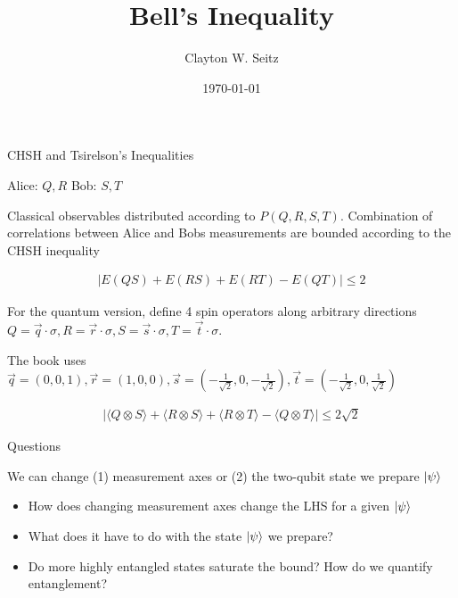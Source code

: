 \documentclass[aspectratio=1610]{beamer}					%
\title{Bell's Inequality}	%
\author{Clayton W. Seitz}								%
\date{\today}									%
\begin{document}
\begin{frame}
  \titlepage
\end{frame}

\begin{frame}{CHSH and Tsirelson's Inequalities}

\vspace{0.2in}

Alice: $Q,R$
Bob: $S, T$

\vspace{0.1in}
Classical observables distributed according to $P(Q,R,S,T)$. Combination of correlations between Alice and Bobs measurements are bounded according to the CHSH inequality

\begin{align*}
|E(QS) + E(RS) + E(RT) - E(QT)| \leq 2
\end{align*}

For the quantum version, define 4 spin operators along arbitrary directions $Q = \vec{q}\cdot\sigma, R = \vec{r}\cdot\sigma, S = \vec{s}\cdot\sigma, T = \vec{t}\cdot\sigma$.

The book uses $\vec{q} = (0,0,1), \vec{r} = (1,0,0), \vec{s} = (-\frac{1}{\sqrt{2}},0,-\frac{1}{\sqrt{2}}), \vec{t} = (-\frac{1}{\sqrt{2}},0,\frac{1}{\sqrt{2}})$

\begin{align*}
|\langle Q\otimes S\rangle + \langle R\otimes S\rangle  + \langle R\otimes T\rangle  - \langle Q\otimes T\rangle|  \leq 2\sqrt{2}
\end{align*}



\end{frame}


\begin{frame}{Questions}

We can change (1) measurement axes or (2) the two-qubit state we prepare $\ket{\psi}$\\
\vspace{0.2in}
\begin{itemize}
\item How does changing measurement axes change the LHS for a given $\ket{\psi}$
\item What does it have to do with the state $\ket{\psi}$ we prepare?
\item Do more highly entangled states saturate the bound? How do we quantify entanglement?
\end{itemize}


\end{frame}
\end{document}
